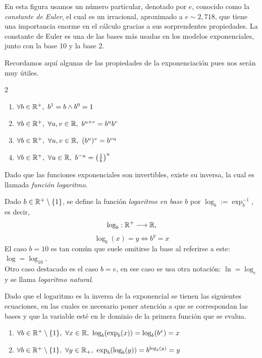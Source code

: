 En esta figura usamos un número particular, denotado por $e$, conocido como la \emph{constante de Euler}, el cual es un irracional, aproximado a $e\sim 2,718$, que tiene una importancia enorme en el cálculo gracias a sus sorprendentes propiedades.
La constante de Euler es una de las bases más usadas en los modelos exponenciales, junto con la base 10 y la base 2.


Recordamos aquí algunas de las propiedades de la exponenciación pues nos serán muy útiles.

\begin{multicols}{2}
\begin{enumerate}
\item $\forall b \in \mathbb{R}^+,\ b^1=b\wedge b^0=1$
\item $\forall b \in \mathbb{R}^+,\ \forall u,v\in\mathbb{R},\  b^{u+v}=b^ub^v$
\item $\forall b \in \mathbb{R}^+,\ \forall u,v\in\mathbb{R},\  (b^u)^v=b^{vu}$
\item $\forall b \in \mathbb{R}^+,\ \forall u\in\mathbb{R},\  b^{-u}=\left(\frac{1}{b}\right)^u$
\end{enumerate}
\end{multicols}

Dado que las funciones exponenciales son invertibles, existe su inversa, la cual es llamada \emph{función logaritmo}.

\begin{defn} 
Dado $b \in \mathbb{R}^+\setminus\{1\}$, se define la función \emph{logaritmo en base $b$} por $\log_b := \exp_b^{-1}$, es decir,
$$\log_b : \mathbb{R}^+ \longrightarrow \mathbb{R},$$
$$ \log_b(x) = y \Leftrightarrow b^y = x $$
El caso $b=10$ es tan común que suele omitirse la base al referirse a este: $\log=\log_{10}$.\\
Otro caso destacado es el caso $b=e$, en ese caso se usa otra notación: $\ln=\log_e$ y se llama \emph{logaritmo natural}.
\end{defn}

Dado que el logaritmo es la inversa de la exponencial se tienen las siguientes ecuaciones, en las cuales es necesario poner atención a que se correspondan las bases y que la variable esté en le dominio de la primera función que se evalua.

\begin{enumerate}
\item $\forall b \in \R^+\setminus\{1\},\ \forall x\in\R,\ \log_b(\exp_b(x))=\log_b(b^x)=x$
\item $\forall b \in \R^+\setminus\{1\},\ \forall y\in\R_+,\ \exp_b(\log_b(y))=b^{\log_b(y)}=y$
\end{enumerate}


